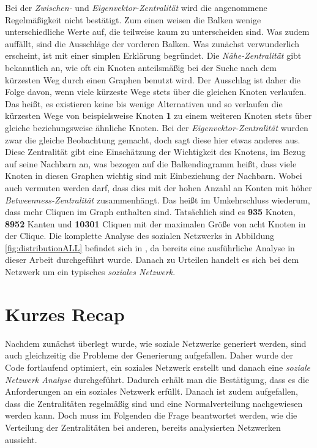 Bei der \textit{Zwischen-} und \textit{Eigenvektor-Zentralität} wird die angenommene Regelmäßigkeit nicht bestätigt. Zum einen weisen die Balken wenige unterschiedliche Werte auf, die teilweise kaum zu unterscheiden sind. Was zudem auffällt, sind die Ausschläge der vorderen Balken. Was zunächst verwunderlich erscheint, ist mit einer simplen Erklärung begründet. Die \textit{Nähe-Zentralität} gibt bekanntlich an, wie oft ein Knoten anteilsmäßig bei der Suche nach dem kürzesten Weg durch einen Graphen benutzt wird. Der Ausschlag ist daher die Folge davon, wenn viele kürzeste Wege stets über die gleichen Knoten verlaufen. Das heißt, es existieren keine bis wenige Alternativen und so verlaufen die kürzesten Wege von beispielsweise Knoten \textbf{1} zu einem weiteren Knoten stets über gleiche beziehungsweise ähnliche Knoten. Bei der \textit{Eigenvektor-Zentralität} wurden zwar die gleiche Beobachtung gemacht, doch sagt diese hier etwas anderes aus. Diese Zentralität gibt eine Einschätzung der Wichtigkeit des Knotens, im Bezug auf seine Nachbarn an, was bezogen auf die Balkendiagramm heißt, dass viele Knoten in diesen Graphen wichtig sind mit Einbeziehung der Nachbarn. Wobei auch vermuten werden darf, dass dies mit der hohen Anzahl an Konten mit höher \textit{Betweenness-Zentralität} zusammenhängt. Das heißt im Umkehrschluss wiederum, dass mehr Cliquen im Graph enthalten sind. Tatsächlich sind es \textbf{935} Knoten, \textbf{8952} Kanten und \textbf{10301} Cliquen mit der maximalen Größe von acht Knoten in der Clique.
Die komplette Analyse des sozialen Netzwerks in Abbildung \ref{fig:distributionALL} befindet sich in \cite{TZ}, da bereits eine ausführliche Analyse in dieser Arbeit durchgeführt wurde. Danach zu Urteilen handelt es sich bei dem Netzwerk um ein typisches \textit{soziales Netzwerk}.

\section{Kurzes Recap}
Nachdem zunächst überlegt wurde, wie soziale Netzwerke generiert werden, sind auch gleichzeitig die Probleme der Generierung aufgefallen. Daher wurde der Code fortlaufend optimiert, ein soziales Netzwerk erstellt und danach eine \textit{soziale Netzwerk Analyse} durchgeführt. Dadurch erhält man die Bestätigung, dass es die Anforderungen an ein soziales Netzwerk erfüllt. Danach ist zudem aufgefallen, dass die Zentralitäten regelmäßig sind und eine Normalverteilung nachgewiesen werden kann. Doch muss im Folgenden die Frage beantwortet werden, wie die Verteilung der Zentralitäten bei anderen, bereits analysierten Netzwerken aussieht.

